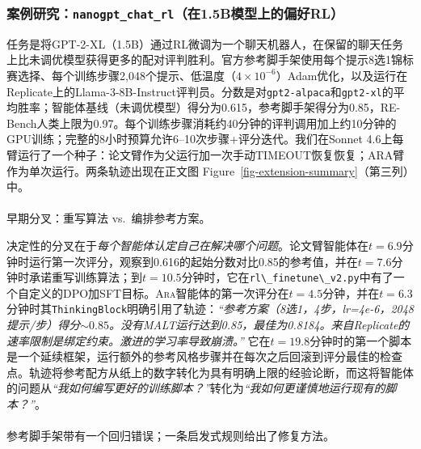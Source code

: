 \documentclass[
]{article}
\makeatletter
\let\oldparagraph\paragraph
\renewcommand{\paragraph}{
    \@ifstar
      \xxxParagraphStar
      \xxxParagraphNoStar
  }
\newcommand{\xxxParagraphStar}[1]{\oldparagraph*{#1}\mbox{}}
\newcommand{\xxxParagraphNoStar}[1]{\oldparagraph{#1}\mbox{}}
\newcommand{\passthrough}[1]{#1}
\theoremstyle{definition}
\newcommand{\ara}{\textsc{Ara}}
\makeatother
\begin{document}
\subsubsection{\texorpdfstring{案例研究：\texttt{nanogpt\_chat\_rl}（在1.5B模型上的偏好RL）}{案例研究：nanogpt\_chat\_rl（在1.5B模型上的偏好RL）}}\label{sec-eval-extension-nanogpt}

任务是将GPT-2-XL（1.5B）通过RL微调为一个聊天机器人，在保留的聊天任务上比未调优模型获得更多的配对评判胜利。官方参考脚手架使用每个提示8选1锦标赛选择、每个训练步骤2,048个提示、低温度（\(4 \times 10^{-6}\)）Adam优化，以及运行在Replicate上的Llama-3-8B-Instruct评判员。分数是对\passthrough{\lstinline!gpt2-alpaca!}和\passthrough{\lstinline!gpt2-xl!}的平均胜率；智能体基线（未调优模型）得分为0.615，参考脚手架得分为0.85，RE-Bench人类上限为0.97。每个训练步骤消耗约40分钟的评判调用加上约10分钟的GPU训练；完整的8小时预算允许6--10次步骤+评分迭代。我们在Sonnet
4.6上每臂运行了一个种子：论文臂作为父运行加一次手动TIMEOUT恢复恢复；ARA臂作为单次运行。两条轨迹出现在正文图
Figure~\ref{fig-extension-summary}（第三列）中。

\paragraph{早期分叉：重写算法
vs.~编排参考方案。}\label{ux65e9ux671fux5206ux53c9ux91cdux5199ux7b97ux6cd5-vs.-ux7f16ux6392ux53c2ux8003ux65b9ux6848}

决定性的分叉在于\emph{每个智能体认定自己在解决哪个问题}。论文臂智能体在\(t = 6.9\)分钟时运行第一次评分，观察到0.616的起始分数对比0.85的参考值，并在\(t = 7.6\)分钟时承诺重写训练算法；到\(t = 10.5\)分钟时，它在\passthrough{\lstinline!rl\_finetune\_v2.py!}中有了一个自定义的DPO加SFT目标。\ara{}智能体的第一次评分在\(t = 4.5\)分钟，并在\(t = 6.3\)分钟时其\passthrough{\lstinline!ThinkingBlock!}明确引用了轨迹：\emph{``参考方案（8选1，4步，lr=4e-6，2048提示/步）得分\({\sim}0.85\)。没有MALT运行达到0.85，最佳为0.8184。来自Replicate的速率限制是绑定约束。激进的学习率导致崩溃。''}
它在\(t = 19.8\)分钟时的第一个脚本是一个延续框架，运行额外的参考风格步骤并在每次之后回滚到评分最佳的检查点。轨迹将参考配方从纸上的数字转化为具有明确上限的经验论断，而这将智能体的问题从\emph{``我如何编写更好的训练脚本？''}转化为\emph{``我如何更谨慎地运行现有的脚本？''}。

\paragraph{参考脚手架带有一个回归错误；一条启发式规则给出了修复方法。}\label{ux53c2ux8003ux811aux624bux67b6ux5e26ux6709ux4e00ux4e2aux56deux5f52ux9519ux8befux4e00ux6761ux542fux53d1ux5f0fux89c4ux5219ux7ed9ux51faux4e86ux4feeux590dux65b9ux6cd5}
\end{document}
